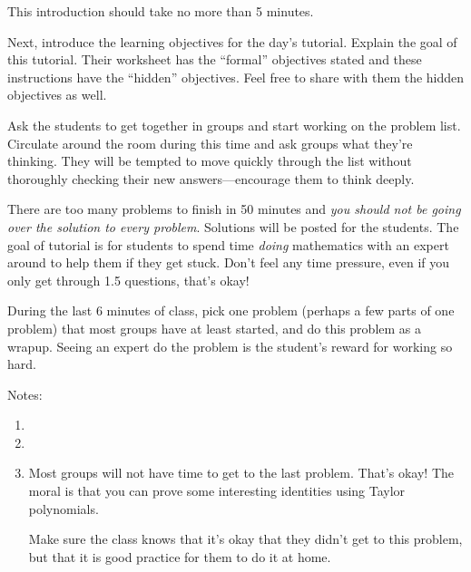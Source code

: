 		This introduction should take no more than 5 minutes.

		Next, introduce the learning objectives for the day's tutorial. Explain the goal of this tutorial. Their worksheet has the ``formal'' objectives stated and these instructions have the ``hidden'' objectives. Feel free to share with them the hidden objectives as well.

		Ask the students to get together in groups and
		start working on the problem list. Circulate around the room during
		this time and ask groups what they're thinking. They will be tempted
		to move quickly through the list without thoroughly checking their
		new answers---encourage them to think deeply.

		There are too many problems to finish in 50 minutes and \emph{you should not be going
		over the solution to every problem}. Solutions will be posted for the students. The goal
		of tutorial is for students to spend time \emph{doing} mathematics with an expert around
		to help them if they get stuck. Don't feel any time pressure, even if you only get through 1.5
		questions, that's okay!

		During the last 6 minutes of class, pick one problem (perhaps a few parts of one problem)
		that most groups have at least started, and do this problem as a wrapup. Seeing an expert do the
		problem is the student's reward for working so hard.

		Notes:
		\begin{enumerate}

                \item 
                \item 
			\item Most groups will not have time to get to the last problem. That's okay! The moral is that you can prove some interesting identities using Taylor polynomials.

			Make sure the class knows that it's okay that they didn't get to this problem, but that it is good practice for them to do it at home.
		\end{enumerate}
